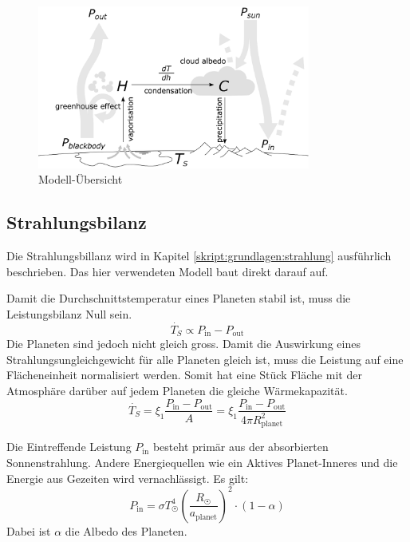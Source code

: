 \begin{refsection}
	

\begin{figure}
	\centering
	\includegraphics[width=0.8\textwidth]{planeten/Pictures/Model.eps}
	\caption{Modell-Übersicht}
	\label{planeten:model}
\end{figure}

\subsection{Strahlungsbilanz}
Die Strahlungsbillanz wird in Kapitel \ref{skript:grundlagen:strahlung} ausführlich beschrieben. Das hier verwendeten Modell baut direkt darauf auf.

Damit die Durchschnittstemperatur eines Planeten stabil ist, muss die Leistungsbilanz Null sein.
\begin{equation}
\dot{T_S} \propto P_{\text{in}} - P_{\text{out}}
\end{equation}
Die Planeten sind jedoch nicht gleich gross. Damit die Auswirkung eines Strahlungsungleichgewicht für alle Planeten gleich ist, muss die Leistung auf eine Flächeneinheit normalisiert werden. Somit hat eine Stück Fläche mit der Atmosphäre darüber auf jedem Planeten die gleiche Wärmekapazität.
\begin{equation}
\dot{T_S} = \xi_1 \frac{P_{\text{in}} - P_{\text{out}}}{A} = \xi_1 \frac{P_{\text{in}} - P_{\text{out}}}{4 \pi R_{\text{planet}}^2}
\end{equation}

Die Eintreffende Leistung $P_{\text{in}}$ besteht primär aus der absorbierten Sonnenstrahlung. Andere Energiequellen wie ein Aktives Planet-Inneres und die Energie aus Gezeiten wird vernachlässigt. Es gilt:
\begin{equation}
P_{\text{in}} = \sigma T_{\astrosun}^4 \left( \frac{R_{\astrosun}}{a_{\text{planet}}} \right) ^2 \cdot (1-\alpha)
\end{equation}
Dabei ist $\alpha$ die Albedo des Planeten.


\end{refsection}
